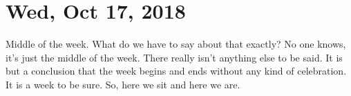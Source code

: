 \section{Wed, Oct 17, 2018}

Middle of the week. What do we have to say about that exactly? No one knows, it's
just the middle of the week. There really isn't anything else to be said. It is but a
conclusion that the week begins and ends without any kind of celebration. It is a
week to be sure. So, here we sit and here we are.
